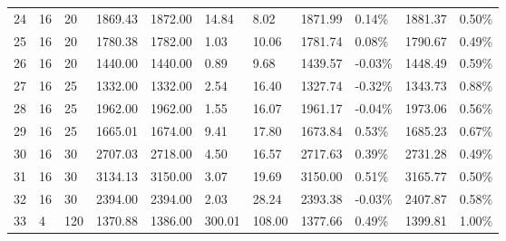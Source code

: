 \documentclass[../main]{subfiles}
\begin{document}
\begin{longtable}{l|ll|lll|lllll}
   24                  & 16                              & 20                     & 1869.43             & 1872.00  & 14.84         & \cellcolor{green!25}8.02   & \cellcolor{green!25}1871.99 & 0.14\%  & 1881.37 & 0.50\% \\
   25                  & 16                              & 20                     & 1780.38             & 1782.00  & 1.03          & 10.06                      & \cellcolor{green!25}1781.74 & 0.08\%  & 1790.67 & 0.49\% \\
   26                  & 16                              & 20                     & 1440.00             & 1440.00  & 0.89          & 9.68                       & 1439.57                     & -0.03\% & 1448.49 & 0.59\% \\
   27                  & 16                              & 25                     & 1332.00             & 1332.00  & 2.54          & 16.40                      & 1327.74                     & -0.32\% & 1343.73 & 0.88\% \\
   28                  & 16                              & 25                     & 1962.00             & 1962.00  & 1.55          & 16.07                      & 1961.17                     & -0.04\% & 1973.06 & 0.56\% \\
   29                  & 16                              & 25                     & 1665.01             & 1674.00  & 9.41          & 17.80                      & \cellcolor{green!25}1673.84 & 0.53\%  & 1685.23 & 0.67\% \\
   30                  & 16                              & 30                     & 2707.03             & 2718.00  & 4.50          & 16.57                      & \cellcolor{green!25}2717.63 & 0.39\%  & 2731.28 & 0.49\% \\
   31                  & 16                              & 30                     & 3134.13             & 3150.00  & 3.07          & 19.69                      & \cellcolor{green!25}3150.00 & 0.51\%  & 3165.77 & 0.50\% \\
   32                  & 16                              & 30                     & 2394.00             & 2394.00  & 2.03          & 28.24                      & 2393.38                     & -0.03\% & 2407.87 & 0.58\% \\
   33                  & 4                               & 120                    & 1370.88             & 1386.00  & 300.01        & \cellcolor{green!25}108.00 & \cellcolor{green!25}1377.66 & 0.49\%  & 1399.81 & 1.00\% \\

\end{longtable}
\end{document}
